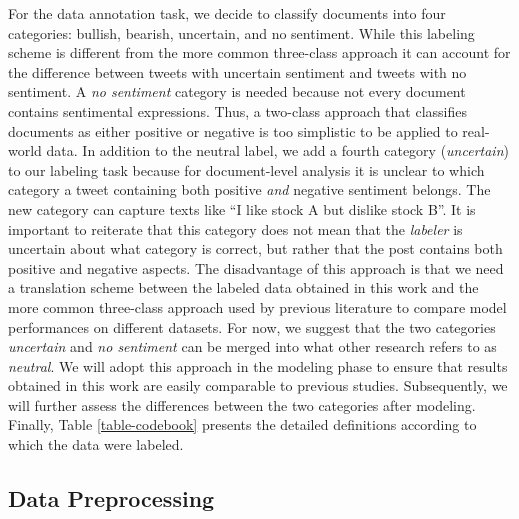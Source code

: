For the data annotation task, we decide to classify documents into four categories: bullish, bearish, uncertain, and no sentiment. While this labeling scheme is different from the more common three-class approach it can account for the difference between tweets with uncertain sentiment and tweets with no sentiment. A \emph{no sentiment} category is needed because not every document contains sentimental expressions. Thus, a two-class approach that classifies documents as either positive or negative is too simplistic to be applied to real-world data. In addition to the neutral label, we add a fourth category (\emph{uncertain}) to our labeling task because for document-level analysis it is unclear to which category a tweet containing both positive \emph{and} negative sentiment belongs. The new category can capture texts like ``I like stock A but dislike stock B''. It is important to reiterate that this category does not mean that the \emph{labeler} is uncertain about what category is correct, but rather that the post contains both positive and negative aspects.
 The disadvantage of this approach is that we need a translation scheme between the labeled data obtained in this work and the more common three-class approach used by previous literature to compare model performances on different datasets. For now, we suggest that the two categories \emph{uncertain} and \emph{no sentiment} can be merged into what other research refers to as \emph{neutral}. We will adopt this approach in the modeling phase to ensure that results obtained in this work are easily comparable to previous studies. Subsequently, we will further assess the differences between the two categories after modeling.
 Finally, Table \ref{table-codebook} presents the detailed definitions according to which the data were labeled.








\newpage
\subsection{Data Preprocessing}
\label{section-data-preprocessing}
